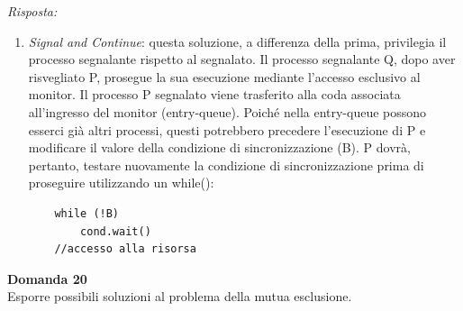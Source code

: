 \documentclass{article}
\newenvironment{problem}[2][Domanda]
    { \begin{mdframed}[backgroundcolor=gray!20] \textbf{#1 #2} \\}
    {  \end{mdframed}}
\newenvironment{solution}
    {\textit{Risposta:}}
    {}
\begin{document}
\begin{solution}
\begin{enumerate}
    \item  \emph{Signal and Continue}: questa soluzione, a differenza della prima, privilegia il processo segnalante rispetto al segnalato. Il processo segnalante Q, dopo aver risvegliato P, prosegue la sua esecuzione mediante l’accesso esclusivo al monitor. Il processo P segnalato viene trasferito alla coda associata all’ingresso del monitor (entry-queue).
    \newline
    Poiché nella entry-queue possono esserci già altri processi, questi potrebbero precedere l’esecuzione di P e modificare il valore della condizione di sincronizzazione (B). 
    \newline
    P dovrà, pertanto, testare nuovamente la condizione di sincronizzazione prima di proseguire utilizzando un while():
    \begin{verbatim}
    while (!B)
        cond.wait()
    //accesso alla risorsa
    \end{verbatim}
    \end{enumerate}
\end{solution}
\begin{problem}{20}
Esporre possibili soluzioni al problema della mutua esclusione.
\end{problem}
\end{document}
